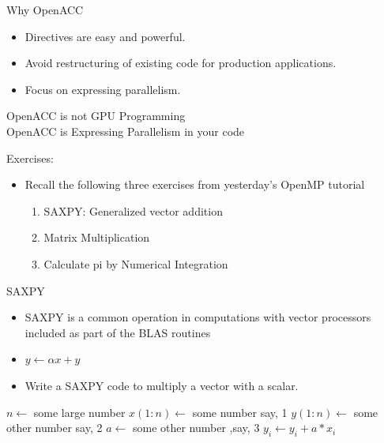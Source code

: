 \documentclass[10pt,t]{beamer}
\begin{document}
\begin{frame}{ Why OpenACC}
  \begin{exampleblock}{}
    \begin{itemize}
      \item Directives are easy and powerful.
      \item Avoid restructuring of existing code for production applications.
      \item Focus on expressing parallelism.
    \end{itemize}
  \end{exampleblock}
  \vspace{1cm}
  \begin{alertblock}{}
    \begin{center}
      \vspace{0.1cm}
      \Large{\color{red!80!black}OpenACC is not GPU Programming}\\
      \vspace{1cm}
      \Large{\color{red!80!black}OpenACC is Expressing Parallelism in your code}
    \end{center}
  \end{alertblock}
\end{frame}

\begin{frame}{Exercises:}
  \begin{itemize}
    \item Recall the following three exercises from yesterday's OpenMP tutorial
    \begin{enumerate}
      \item SAXPY: Generalized vector addition
      \item Matrix Multiplication
      \item Calculate pi by Numerical Integration
    \end{enumerate}
  \end{itemize}
\end{frame}

\begin{frame}{ SAXPY}
  \begin{itemize}
    \item SAXPY is a common operation in computations with vector processors included as part of the BLAS routines
    \item[] $y\leftarrow \alpha x + y$
    \item Write a SAXPY code to multiply a vector with a scalar.
  \end{itemize}
  \begin{algorithm}[H]
    \caption{Pseudo Code for SAXPY}
    \begin{algorithmic}
      \State $n \gets$ some large number
      \State $x(1:n) \gets$ some number say, 1
      \State $y(1:n) \gets$ some other number say, 2
      \State $a \gets$ some other number ,say, 3
      \State $y_i \gets y_i + a * x_i$
      \EndDo
    \end{algorithmic}
  \end{algorithm}
\end{frame}
\end{document}
